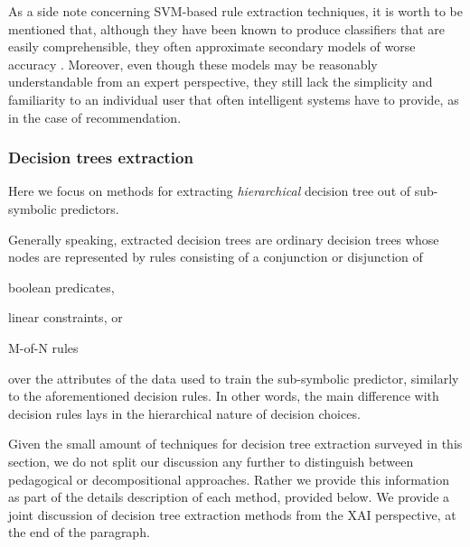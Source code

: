 \documentclass[12pt,a4paper,openright,twoside]{book}
\begin{document}
As a side note concerning SVM-based rule extraction techniques, it is worth to be mentioned that, although they have been known to produce classifiers that are easily comprehensible, they often approximate secondary models of worse accuracy \cite{Barakat2010}.
%
Moreover, even though these models may be reasonably understandable from an expert perspective, they still lack the simplicity and familiarity to an individual user that often intelligent systems have to provide, as in the case of recommendation.




\subsubsection{Decision trees extraction}

Here we focus on methods for extracting \emph{hierarchical} decision tree out of sub-symbolic predictors.

Generally speaking, extracted decision trees are ordinary decision trees whose nodes are represented by rules consisting of a conjunction or disjunction of
%
\begin{inlinelist}
    \item boolean predicates,
    \item linear constraints, or
    \item M-of-N rules
\end{inlinelist}
%
over the attributes of the data used to train the sub-symbolic predictor, similarly to the aforementioned decision rules.
%
In other words, the main difference with decision rules lays in the hierarchical nature of decision choices.

Given the small amount of techniques for decision tree extraction surveyed in this section, we do not split our discussion any further to distinguish between pedagogical or decompositional approaches.
%
Rather we provide this information as part of the details description of each method, provided below.
%
We provide a joint discussion of decision tree extraction methods from the XAI perspective, at the end of the paragraph.
\end{document}
